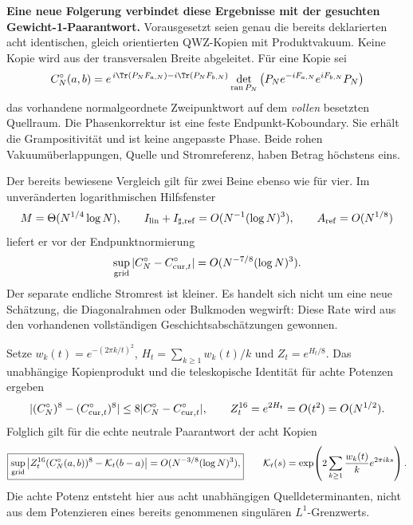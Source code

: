 \textbf{Eine neue Folgerung verbindet diese Ergebnisse mit der gesuchten Gewicht-1-Paarantwort.} Vorausgesetzt seien genau die bereits deklarierten acht identischen, gleich orientierten QWZ-Kopien mit Produktvakuum. Keine Kopie wird aus der transversalen Breite abgeleitet. Für eine Kopie sei
\[
 C_N^\circ(a,b)=
 e^{\,i\Tr(P_NF_{a,N})-i\Tr(P_NF_{b,N})}
 \det_{\operatorname{ran}P_N}
 \left(P_Ne^{-iF_{a,N}}e^{iF_{b,N}}P_N\right)
\]
das vorhandene normalgeordnete Zweipunktwort auf dem \emph{vollen} besetzten Quellraum. Die Phasenkorrektur ist eine feste Endpunkt-Koboundary. Sie erhält die Grampositivität und ist keine angepasste Phase. Beide rohen Vakuumüberlappungen, Quelle und Stromreferenz, haben Betrag höchstens eins.

Der bereits bewiesene Vergleich gilt für zwei Beine ebenso wie für vier. Im unveränderten logarithmischen Hilfsfenster
\[
 M=\Theta(N^{1/4}\log N),\qquad
 I_{\rm lin}+I_{\sharp,\rm ref}=O(N^{-1}(\log N)^3),
 \qquad A_{\rm ref}=O(N^{1/8})
\]
liefert er vor der Endpunktnormierung
\begin{equation}\label{eq:onecopyrawpairrate}
 \sup_{\rm grid}|C_N^\circ-C_{{\rm cur},t}^\circ|
 =O(N^{-7/8}(\log N)^3).
\end{equation}
Der separate endliche Stromrest ist kleiner. Es handelt sich nicht um eine neue Schätzung, die Diagonalrahmen oder Bulkmoden wegwirft: Diese Rate wird aus den vorhandenen vollständigen Geschichtsabschätzungen gewonnen.

Setze $w_k(t)=e^{-(2\pi k/t)^2}$,
$H_t=\sum_{k\ge1}w_k(t)/k$ und $Z_t=e^{H_t/8}$. Das unabhängige Kopienprodukt und die teleskopische Identität für achte Potenzen ergeben
\[
 |(C_N^\circ)^8-(C_{{\rm cur},t}^\circ)^8|
 \le8|C_N^\circ-C_{{\rm cur},t}^\circ|,
 \qquad Z_t^{16}=e^{2H_t}=O(t^2)=O(N^{1/2}).
\]
Folglich gilt für die echte neutrale Paarantwort der acht Kopien
\begin{equation}\label{eq:eightcopyspinorpairrate}
 \boxed{\sup_{\rm grid}
 \left|Z_t^{16}(C_N^\circ(a,b))^8-\mathcal K_t(b-a)\right|
 =O(N^{-3/8}(\log N)^3),}
 \qquad
 \mathcal K_t(s)=
 \exp\!\left(2\sum_{k\ge1}\frac{w_k(t)}k e^{2\pi i k s}\right).
\end{equation}
Die achte Potenz entsteht hier aus acht unabhängigen Quelldeterminanten, nicht aus dem Potenzieren eines bereits genommenen singulären $L^1$-Grenzwerts.

